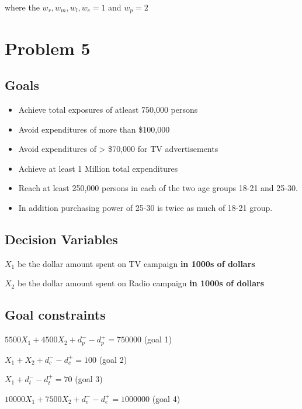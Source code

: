 \documentclass[]{article}
\providecommand{\tightlist}{%
  \setlength{\itemsep}{0pt}\setlength{\parskip}{0pt}}
\begin{document}
where the \(w_{r},w_{m},w_{l},w_{c} = 1\) and \(w_{p} = 2\)

\pagebreak

\section{Problem 5}\label{problem-5}

\subsection{Goals}\label{goals-1}

\begin{itemize}
\tightlist
\item
  Achieve total exposures of atleast 750,000 persons
\item
  Avoid expenditures of more than \$100,000
\item
  Avoid expenditures of \textgreater{} \$70,000 for TV advertisements
\item
  Achieve at least 1 Million total expenditures
\item
  Reach at least 250,000 persons in each of the two age groups 18-21 and
  25-30.
\item
  In addition purchasing power of 25-30 is twice as much of 18-21 group.
\end{itemize}

\subsection{Decision Variables}\label{decision-variables-3}

\(X_{1}\) be the dollar amount spent on TV campaign \textbf{in 1000s of
dollars}

\(X_{2}\) be the dollar amount spent on Radio campaign \textbf{in 1000s
of dollars}

\subsection{Goal constraints}\label{goal-constraints}

\(5500X_{1} + 4500X_{2} + d_{p}^{-} - d_{p}^{+} = 750000\) (goal 1)

\(X_{1} + X_{2} + d_{c}^{-} - d_{c}^{+} = 100\) (goal 2)

\(X_{1} + d_{t}^{-} - d_{t}^{+} = 70\) (goal 3)

\(10000X_{1} + 7500X_{2} + d_{e}^{-}-d_{e}^{+}= 1000000\) (goal 4)
\end{document}
